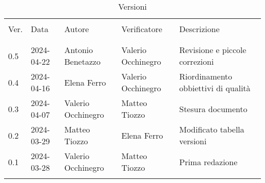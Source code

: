 \documentclass[italian,12pt]{article} %
\begin{document}

\newpage

\captionsetup[table]{list=no}
\begin{table}[!h]
	\caption*{Versioni}
	\footnotesize
	\begin{center}
		\begin{tabular}{ l l l l l }
			\hline                                                                                            \\[-2ex]
			Ver. & Data       & Autore             & Verificatore       & Descrizione                         \\
			\\[-2ex] \hline \\[-1.5ex]
			0.5  & 2024-04-22 & Antonio Benetazzo  & Valerio Occhinegro & Revisione e piccole correzioni      \\
			0.4  & 2024-04-16 & Elena Ferro        & Valerio Occhinegro & Riordinamento obbiettivi di qualità \\
			0.3  & 2024-04-07 & Valerio Occhinegro & Matteo Tiozzo      & Stesura documento                   \\
			0.2  & 2024-03-29 & Matteo Tiozzo      & Elena Ferro        & Modificato tabella versioni         \\
			0.1  & 2024-03-28 & Valerio Occhinegro & Matteo Tiozzo      & Prima redazione                     \\
			\\[-1.5ex] \hline
		\end{tabular}
	\end{center}
\end{table}
\captionsetup[table]{list=yes}
\newpage
\tableofcontents
\listoftables
\listoffigures
\newpage





\end{document}
